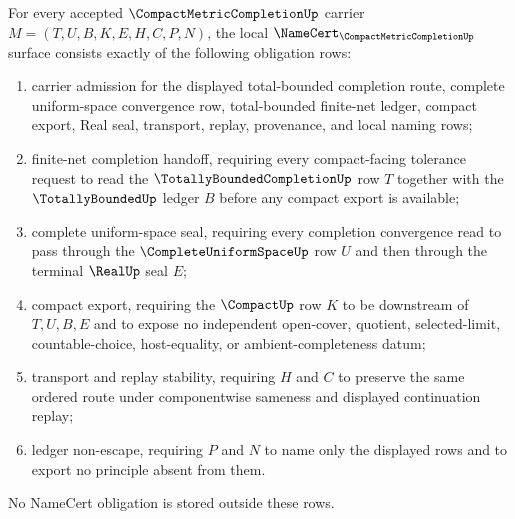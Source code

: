 \begin{theorem}\label{thm:compact-metric-completion-namecert-obligations}
For every accepted $\CompactMetricCompletionUp$ carrier $M=(T,U,B,K,E,H,C,P,N)$, the local $\NameCert_{\CompactMetricCompletionUp}$ surface consists exactly of the following obligation rows:
\begin{enumerate}
\item carrier admission for the displayed total-bounded completion route, complete uniform-space convergence row, total-bounded finite-net ledger, compact export, Real seal, transport, replay, provenance, and local naming rows;
\item finite-net completion handoff, requiring every compact-facing tolerance request to read the $\TotallyBoundedCompletionUp$ row $T$ together with the $\TotallyBoundedUp$ ledger $B$ before any compact export is available;
\item complete uniform-space seal, requiring every completion convergence read to pass through the $\CompleteUniformSpaceUp$ row $U$ and then through the terminal $\RealUp$ seal $E$;
\item compact export, requiring the $\CompactUp$ row $K$ to be downstream of $T,U,B,E$ and to expose no independent open-cover, quotient, selected-limit, countable-choice, host-equality, or ambient-completeness datum;
\item transport and replay stability, requiring $H$ and $C$ to preserve the same ordered route under componentwise sameness and displayed continuation replay;
\item ledger non-escape, requiring $P$ and $N$ to name only the displayed rows and to export no principle absent from them.
\end{enumerate}
No NameCert obligation is stored outside these rows.
\end{theorem}
